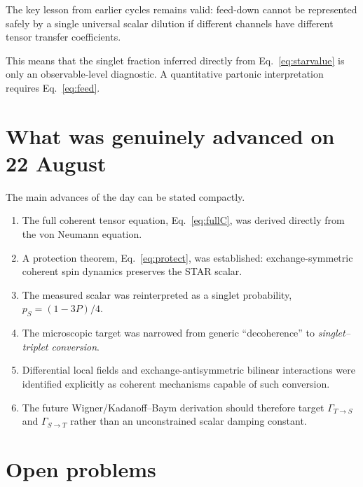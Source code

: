 \documentclass[11pt]{article}
\begin{document}
The key lesson from earlier cycles remains valid:
feed-down cannot be represented safely by a single universal scalar dilution if different channels
have different tensor transfer coefficients.

This means that the singlet fraction inferred directly from Eq.~\eqref{eq:starvalue} is only an
observable-level diagnostic. A quantitative partonic interpretation requires Eq.~\eqref{eq:feed}.

\section{What was genuinely advanced on 22 August}

The main advances of the day can be stated compactly.

\begin{enumerate}[leftmargin=1.5em]
\item The full coherent tensor equation, Eq.~\eqref{eq:fullC}, was derived directly from
      the von Neumann equation.
\item A protection theorem, Eq.~\eqref{eq:protect}, was established:
      exchange-symmetric coherent spin dynamics preserves the STAR scalar.
\item The measured scalar was reinterpreted as a singlet probability,
      $p_S=(1-3P)/4$.
\item The microscopic target was narrowed from generic ``decoherence'' to
      \emph{singlet--triplet conversion}.
\item Differential local fields and exchange-antisymmetric bilinear interactions were identified
      explicitly as coherent mechanisms capable of such conversion.
\item The future Wigner/Kadanoff--Baym derivation should therefore target
      $\Gamma_{T\to S}$ and $\Gamma_{S\to T}$ rather than an unconstrained scalar damping constant.
\end{enumerate}

\section{Open problems}
\end{document}
